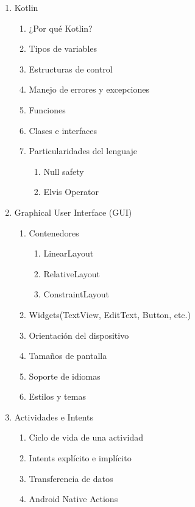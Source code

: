 \documentclass[11pt]{mylib/documentoProteco}
\begin{document}
\vspace*{4mm}
\selectfont

\setlength{\footskip}{60pt}

\renewcommand{\labelenumiii}{\roman{enumiii}}
\begin{multicols*}{2}
\begin{enumerate}
  \item Kotlin
  \begin{enumerate}
    \item ¿Por qué Kotlin?
    \item Tipos de variables
    \item Estructuras de control
    \item Manejo de errores y excepciones
    \item Funciones
    \item Clases e interfaces
    \item Particularidades del lenguaje
    \begin{enumerate}
      \item Null safety
      \item Elvis Operator
    \end{enumerate}
  \end{enumerate}

  \item Graphical User Interface (GUI)
  \begin{enumerate}
    \item Contenedores
    \begin{enumerate}
      \item LinearLayout
      \item RelativeLayout
      \item ConstraintLayout
    \end{enumerate}
    \item Widgets(TextView, EditText, Button, etc.)
    \item Orientación del dispositivo
    \item Tamaños de pantalla
    \item Soporte de idiomas
    \item Estilos y temas
  \end{enumerate}

  \item Actividades e Intents
  \begin{enumerate}
    \item Ciclo de vida de una actividad
    \item Intents explícito e implícito
    \item Transferencia de datos
    \item Android Native Actions
  \end{enumerate}


\end{enumerate}
\end{multicols*}
\end{document}

